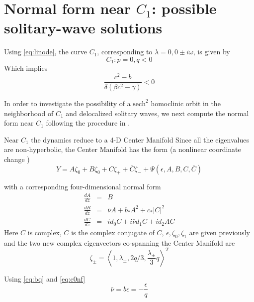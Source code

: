 \section{Normal form near $C_1$: possible solitary-wave solutions}
Using \eqref{eq:linode}, the curve $C_1$, corresponding to $\lambda = 0, 0\pm i \omega$, is given by
\begin{equation}\label{eq:c1}
C_1 : { p = 0, q < 0 }
\end{equation}
Which implies
\begin{equation}
\frac{c^2 - b}{ \delta\left(\beta c^2 - \gamma \right)} < 0
\end{equation}

In order to investigate the possibility of a $ \textrm{sech}^2 $  homoclinic orbit in the neighborhood of $C_1$ and delocalized solitary
waves, we next compute the normal form near $C_1$ following the procedure in \cite{IA}.

Near $C_1$ the dynamics reduce to a 4-D Center Manifold \cite{IA}
Since all the eigenvalues are non-hyperbolic, the Center Manifold has the form (a nonlinear coordinate change \cite{IA})
\begin{equation} \label{eq:c1cm}
Y = A \zeta_0 + B \zeta_0 + C \zeta_+ + \bar{C} \zeta_- + \Psi(\epsilon,A,B,C,\bar{C})
\end{equation}

with  a corresponding four-dimensional normal form
\begin{subequations}
\begin{eqnarray}\label{eq:c1nf}
\frac{dA}{dz} &=& B \\ \label{eq:aq}
\frac{dB}{dz} &=& \bar{\nu} A + b_* A^2 + c_* \left|C\right|^2 \\ \label{eq:bq}
\frac{dC}{dz} &=& i d_0 C + i \bar{\nu} d_1 C + i d_2 A C \label{eq:cq}
\end{eqnarray}
\end{subequations}
Here $C$ is complex, $\bar{C}$ is the complex conjugate of $C$, $\epsilon, \zeta_0, \zeta_1$ are given previously and the two new
complex eigenvectors co-spanning the Center Manifold are
\begin{equation}
\zeta_\pm	 = \left< 1, \lambda_\pm, 2 q / 3, \frac{\lambda_\pm}{3} q\right>^T 
\end{equation}

Using \eqref{eq:bq} and \eqref{eq:c0nf}
\begin{equation}
\bar{\nu} = b \epsilon = -\frac{\epsilon}{q} 
\end{equation}

